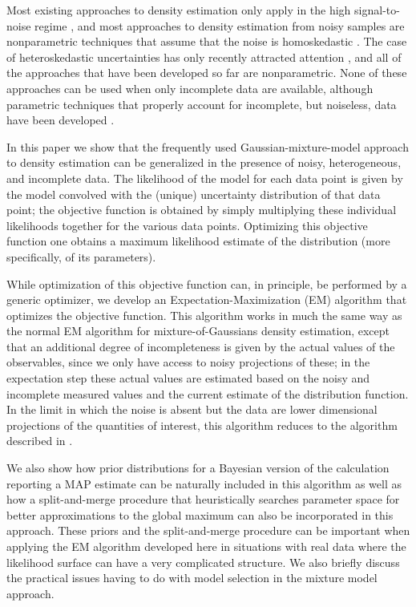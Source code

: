 \documentclass[aoas,preprint,authoryear,round]{imsart}
\newcommand{\eg}{e.g.}
\begin{document}
Most existing approaches to density estimation only apply in the high
signal-to-noise regime
\citep[\eg,][]{McLachlan1988,Silverman86a,diebolt94a},
and most approaches to density estimation from noisy samples are
nonparametric techniques that assume that the noise is homoskedastic
\citep[\eg][]{Stefanski90a,Zhang90a}. The case of heteroskedastic
uncertainties has only recently attracted attention
\citep[\eg][]{Delaigle08a,Staudenmayer08a}, and all of the approaches
that have been developed so far are nonparametric. None of these
approaches can be used when only incomplete data are available,
although parametric techniques that properly account for incomplete,
but noiseless, data have been developed
\citep{Ghahramani1994,Ghahramani1994b}.

In this paper we show that the frequently used Gaussian-mixture-model
approach to density estimation can be generalized in the presence of
noisy, heterogeneous, and incomplete data. The likelihood of the model
for each data point is given by the model convolved with the (unique)
uncertainty distribution of that data point; the objective function is
obtained by simply multiplying these individual likelihoods together
for the various data points. Optimizing this objective function one
obtains a maximum likelihood estimate of the distribution (more
specifically, of its parameters).

While optimization of this objective function can, in principle, be
performed by a generic optimizer, we develop an
Expectation-Maximization (EM) algorithm that optimizes the objective
function. This algorithm works in much the same way as the normal EM
algorithm for mixture-of-Gaussians density estimation, except that an
additional degree of incompleteness is given by the actual values of
the observables, since we only have access to noisy projections of
these; in the expectation step these actual values are estimated based
on the noisy and incomplete measured values and the current estimate
of the distribution function. In the limit in which the noise is
absent but the data are lower dimensional projections of the
quantities of interest, this algorithm reduces to the algorithm
described in \citet{Ghahramani1994,Ghahramani1994b}.

We also show how prior distributions for a Bayesian version of the
calculation reporting a MAP estimate can be naturally included in this
algorithm as well as how a split-and-merge procedure that
heuristically searches parameter space for better approximations to
the global maximum can also be incorporated in this approach. These
priors and the split-and-merge procedure can be important when
applying the EM algorithm developed here in situations with real data
where the likelihood surface can have a very complicated structure. We
also briefly discuss the practical issues having to do with model
selection in the mixture model approach.
\end{document}
